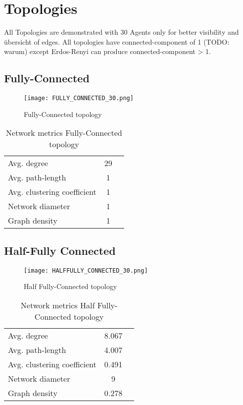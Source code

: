 \documentclass[Bachelorarbeit.tex]{subfiles}
\begin{document}
\graphicspath{{./figures/appendixTopologies/}}	%

\chapter{Topologies}
All Topologies are demonstrated with 30 Agents only for better visibility and übersicht of edges. 
All topologies have connected-component of 1 (TODO: warum) except Erdos-Renyi can produce connected-component > 1.

\section{Fully-Connected}

\begin{figure}[H]
	\centering
  \texttt{[image: FULLY\_CONNECTED\_30.png]}
	\caption{Fully-Connected topology}
	\label{fig1}
\end{figure}

\begin{table}[h]
	\centering
	\caption{Network metrics Fully-Connected topology}
	\begin{tabular} { l c r }
		\hline
		Avg. degree & 29 \\
		Avg. path-length & 1 \\
		Avg. clustering coefficient & 1 \\
		Network diameter & 1 \\
		Graph density & 1 \\
		\hline
	\end{tabular}
\end{table}

\section{Half-Fully Connected}
\begin{figure}[H]
	\centering
  \texttt{[image: HALFFULLY\_CONNECTED\_30.png]}
	\caption{Half Fully-Connected topology}
	\label{fig1}
\end{figure}

\begin{table}[h]
	\centering
	\caption{Network metrics Half Fully-Connected topology}
	\begin{tabular} { l c r }
		\hline
		Avg. degree & 8.067 \\
		Avg. path-length & 4.007 \\
		Avg. clustering coefficient & 0.491 \\
		Network diameter & 9 \\
		Graph density & 0.278 \\
		\hline
	\end{tabular}
\end{table}
\end{document}
